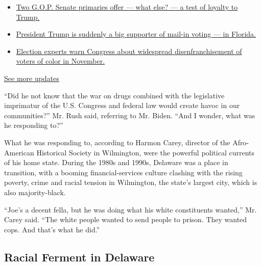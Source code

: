 \begin{itemize}
\tightlist
\item
  \href{https://www.nytimes3xbfgragh.onion/2020/08/04/us/elections/primary-election-michigan-arizona-kansas.html?action=click\&pgtype=Article\&state=default\&region=MAIN_CONTENT_1\&context=storylines_live_updates\#link-3924dd44}{Two
  G.O.P. Senate primaries offer --- what else? --- a test of loyalty to
  Trump.}
\item
  \href{https://www.nytimes3xbfgragh.onion/2020/08/04/us/elections/primary-election-michigan-arizona-kansas.html?action=click\&pgtype=Article\&state=default\&region=MAIN_CONTENT_1\&context=storylines_live_updates\#link-32b39e33}{President
  Trump is suddenly a big supporter of mail-in voting --- in Florida.}
\item
  \href{https://www.nytimes3xbfgragh.onion/2020/08/04/us/elections/primary-election-michigan-arizona-kansas.html?action=click\&pgtype=Article\&state=default\&region=MAIN_CONTENT_1\&context=storylines_live_updates\#link-6d019753}{Election
  experts warn Congress about widespread disenfranchisement of voters of
  color in November.}
\end{itemize}

\href{https://www.nytimes3xbfgragh.onion/2020/08/04/us/elections/primary-election-michigan-arizona-kansas.html?action=click\&pgtype=Article\&state=default\&region=MAIN_CONTENT_1\&context=storylines_live_updates}{See
more updates}

``Did he not know that the war on drugs combined with the legislative
imprimatur of the U.S. Congress and federal law would create havoc in
our communities?'' Mr. Rush said, referring to Mr. Biden. ``And I
wonder, what was he responding to?''

What he was responding to, according to Harmon Carey, director of the
Afro-American Historical Society in Wilmington, were the powerful
political currents of his home state. During the 1980s and 1990s,
Delaware was a place in transition, with a booming financial-services
culture clashing with the rising poverty, crime and racial tension in
Wilmington, the state's largest city, which is also majority-black.

``Joe's a decent fella, but he was doing what his white constituents
wanted,'' Mr. Carey said. ``The white people wanted to send people to
prison. They wanted cops. And that's what he did.''

\hypertarget{racial-ferment-in-delaware}{%
\subsection{Racial Ferment in
Delaware}\label{racial-ferment-in-delaware}}

